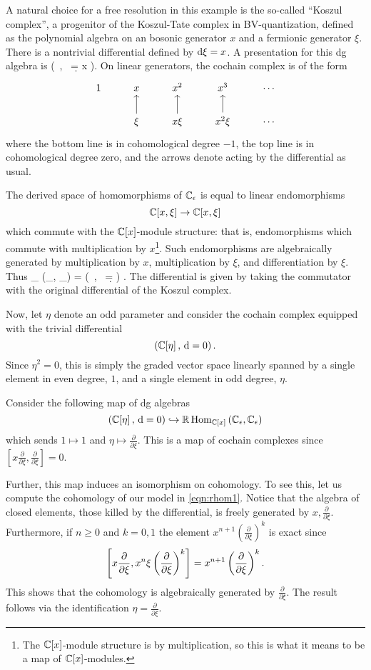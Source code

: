 \documentclass[11pt]{amsart}
\begin{document}
A natural choice for a free resolution in this example is the so-called ``Koszul complex'', a progenitor of the Koszul-Tate complex in BV-quantization, defined as the polynomial algebra on an bosonic generator $x$ and a fermionic generator $\xi$. 
There is a nontrivial differential defined by ${\rm d} \xi = x$. 
A presentation for this dg algebra is 
\beqn\label{eqn:res1}
\bigg(\CC[x, \xi] \, , \, \d = x \frac{\partial}{\partial \xi} \bigg).
\eeqn
On linear generators, the cochain complex is of the form
\[
\begin{tikzcd} 
1 & x & x^2 & x^3 & \cdots \\
& \xi \ar[u] & x \xi \ar[u] & x^2 \xi \ar[u] & \cdots 
\end{tikzcd}
\]
where the bottom line is in cohomological degree $-1$, the top line is in cohomological degree zero, and the arrows denote acting by the differential as usual. 

The derived space of homomorphisms of $\mathbb C_\epsilon$ is equal to linear endomorphisms 
\[
\mathbb C[x, \xi] \to \mathbb C[x,\xi]
\] 
which commute with the $\mathbb C[x]$-module structure: that is, endomorphisms which commute with multiplication by $x$\footnote{The $\mathbb C[x]$-module structure is by multiplication, so this is what it means to be a map of $\mathbb C[x]$-modules.}. 
Such endomorphisms are algebraically generated by multiplication by $x$, multiplication by $\xi$, and differentiation by $\xi$. 
Thus 
\beqn\label{eqn:rhom1}
\RHom_{\CC[x]} \left(\CC_\ep, \CC_\ep\right) = \left(\CC{} \, , \, \d =  \right) .
\eeqn
The differential is given by taking the commutator with the original differential of the Koszul complex. 

Now, let $\eta$ denote an odd parameter and consider the cochain complex equipped with the trivial differential
\[
 \left(\mathbb C[\eta] \, , \, {\rm d} = 0 \right) .
\]
Since $\eta^2=0$, this is simply the graded vector space linearly spanned by a single element in even degree, $1$, and a single element in odd degree, $\eta$. 

Consider the following map of dg algebras
\[
\left(\mathbb C[\eta] \, , \, {\rm d} = 0 \right) \hookrightarrow \mathbb{R}\operatorname{Hom}_{\mathbb C[x]} \left(\mathbb C_\epsilon, \mathbb C_\epsilon\right) 
\]
which sends $1 \mapsto 1$ and $\eta \mapsto \frac{\partial}{\partial \xi}$. 
This is a map of cochain complexes since $\left[x \frac{\partial}{\partial \xi} , \frac{\partial}{\partial \xi}\right] = 0$.

Further, this map induces an isomorphism on cohomology. 
To see this, let us compute the cohomology of our model in \eqref{eqn:rhom1}. 
Notice that the algebra of closed elements, those killed by the differential, is freely generated by $x, \frac{\partial}{\partial \xi}$. 
Furthermore, if $n \geq 0$ and $k = 0,1$ the element $x^{n+1}\left(\frac{\partial}{\partial \xi}\right)^k$ is exact since 
\[
\left[x \frac{\partial}{\partial \xi} , x^n \xi \left(\frac{\partial}{\partial \xi}\right)^k \right] = x^{n+1} \left(\frac{\partial}{\partial \xi}\right)^k . \\
\]
This shows that the cohomology is algebraically generated by $\frac{\partial}{\partial \xi}$. 
The result follows via the identification $\eta = \frac{\partial}{\partial \xi}$. 
\end{document}
